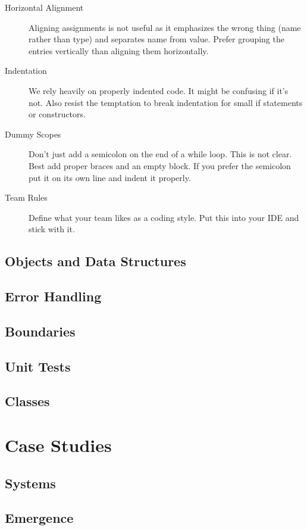 \documentclass[a4paper, twocolumn]{article}
\begin{document}
\begin{description}
	\item[Horizontal Alignment] Aligning assignments is not useful as it emphasizes the wrong thing (name rather than type) and separates name from value. Prefer grouping the entries vertically than aligning them horizontally.
	\item[Indentation] We rely heavily on properly indented code. It might be confusing if it's not. Also resist the temptation to break indentation for small if statements or constructors.
	\item[Dummy Scopes] Don't just add a semicolon on the end of a while loop. This is not clear. Best add proper braces and an empty block. If you prefer the semicolon put it on its own line and indent it properly.
	\item[Team Rules] Define what your team likes as a coding style. Put this into your IDE and stick with it.
\end{description}

\subsection{Objects and Data Structures}

\subsection{Error Handling}

\subsection{Boundaries}

\subsection{Unit Tests}

\subsection{Classes}


\section{Case Studies}

\subsection{Systems}

\subsection{Emergence}
\end{document}

